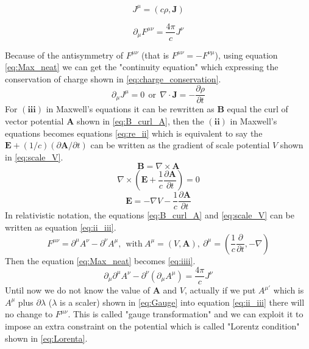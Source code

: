 \begin{equation}
J^{\mu}=(c\rho,\mathbf{J})
\label{eq:J_mu}
\end{equation}

\begin{equation}
\partial_{\mu}F^{\mu\nu}=\frac{4\pi}{c}J^{\nu}
\label{eq:Max_neat}
\end{equation}

Because of the antisymmetry of $F^{\mu\nu}$ (that is $F^{\mu\nu}=-F^{\nu\mu}$), using equation \ref{eq:Max_neat} we can get the "continuity equation" which expressing the conservation of charge shown in \ref{eq:charge_conservation}.
\begin{equation}
\partial_{\mu}J^{\mu}=0~~\mathrm{or}~~\nabla\cdot\mathbf{J}=-\frac{\partial\rho}{\partial t}
\label{eq:charge_conservation}
\end{equation}
For $(\mathbf{iii})$ in Maxwell's equations it can be rewritten as $\mathbf{B}$ equal the curl of vector potential $\mathbf{A}$ shown in \ref{eq:B_curl_A}, then the $(\mathbf{ii})$ in Maxwell's equations becomes equations \ref{eq:re_ii} which is equivalent to say the $\mathbf{E}+(1/c)(\partial\mathbf{A}/\partial t)$ can be written as the gradient of scale potential $V$ shown in \ref{eq:scale_V}.
\begin{equation}
\mathbf{B}=\nabla\times\mathbf{A}
\label{eq:B_curl_A}
\end{equation}
\begin{equation}
\nabla\times(\mathbf{E}+\frac{1}{c}\frac{\partial\mathbf{A}}{\partial t})=0
\label{eq:re_ii}
\end{equation}
\begin{equation}
\mathbf{E}=-\nabla V-\frac{1}{c}\frac{\partial\mathbf{A}}{\partial t}
\label{eq:scale_V}
\end{equation}
In relativistic notation, the equations \ref{eq:B_curl_A} and \ref{eq:scale_V} can be written as equation \ref{eq:ii_iii}.
\begin{equation}
F^{\mu\nu}=\partial^{\mu}A^{\nu}-\partial^{\nu}A^{\mu},~~\mathrm{with}~A^{\mu}=(V,\mathbf{A}),~\partial^{\mu}=(\frac{1}{c}\frac{\partial}{\partial t},-\nabla)
\label{eq:ii_iii}
\end{equation}
Then the equation \ref{eq:Max_neat} becomes \ref{eq:iiii}.
\begin{equation}
\partial_{\mu}\partial^{\mu}A^{\nu}-\partial^{\nu}(\partial_{\mu}A^{\mu})=\frac{4\pi}{c}J^{\nu}
\label{eq:iiii}
\end{equation}
Until now we do not know the value of $\mathbf{A}$ and $V$, actually if we put $A^{\mu'}$ which is $A^{\mu}$ plus $\partial\lambda$ ($\lambda$ is a scaler) shown in \ref{eq:Gauge} into equation \ref{eq:ii_iii} there will no change to $F^{\mu\nu}$. This is called "gauge transformation" and we can exploit it to impose an extra constraint on the potential which is called "Lorentz condition" shown in \ref{eq:Lorenta}.
